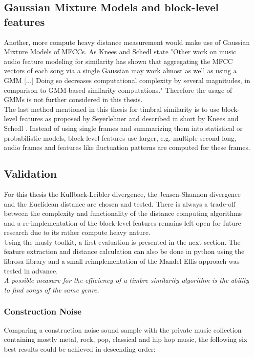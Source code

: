 \subsection{Gaussian Mixture Models and block-level features}
Another, more compute heavy distance measurement would make use of Gaussian Mixture Models of MFCCs. As Knees and Schedl state "Other work on music audio feature modeling for similarity has shown that aggregating the MFCC vectors of each song via a single Gaussian may work almost as well as using a GMM [...] Doing so decreases computational complexity by several magnitudes, in comparison to GMM-based similarity computations." \cite[p. 65]{knees1} Therefore the usage of GMMs is not further considered in this thesis.\\
The last method mentioned in this thesis for timbral similarity is to use block-level features as proposed by Seyerlehner \cite{seyerlehnerblock} and described in short by Knees and Schedl \cite[p. 67]{knees1}. 
Instead of using single frames and summarizing them into statistical or probabilistic models, block-level features use larger, e.g. multiple second long, audio frames and features like fluctuation patterns are computed for these frames. 

\subsection{Validation}

For this thesis the Kullback-Leibler divergence, the Jensen-Shannon divergence and the Euclidean distance are chosen and tested. There is always a trade-off between the complexity and functionality of the distance computing algorithms and a re-implementation of the block-level features remains left open for future research due to its rather compute heavy nature.\\
Using the musly toolkit, a first evaluation is presented in the next section. The feature extraction and distance calculation can also be done in python using the librosa library and a small reimplementation of the Mandel-Ellis approach was tested in advance.\\
\textit{A possible measure for the efficiency of a timbre similarity algorithm is the ability to find songs of the same genre.}

\subsubsection{Construction Noise}
Comparing a construction noise sound sample with the private music collection containing mostly metal, rock, pop, classical and hip hop music, the following six best results could be achieved in descending order: 


